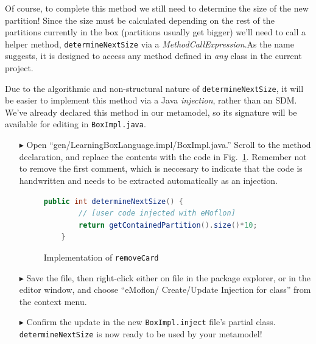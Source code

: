 Of course, to complete this method we still need to determine the size of the new partition! Since the size must be calculated depending on the
rest of the partitions currently in the box (partitions usually get bigger) we'll need to call a helper method, \texttt{determineNextSize} via a
\emph{MethodCallExpression}.As the name suggests, it is designed to access any method defined in \emph{any} class in the current project.

Due to the algorithmic and non-structural nature of \texttt{determineNextSize}, it will be easier to implement this method via a Java \emph{injection}, rather
than an SDM. We've already declared this method in our metamodel, so its signature will be available for editing in \texttt{BoxImpl.java}.

\begin{itemize}

\item[$\blacktriangleright$] Open ``gen/LearningBoxLanguage.impl/BoxImpl.java.'' Scroll to the method declaration, and replace the contents with the code in
Fig.~\ref{code:determineNextSize_impl}. Remember not to remove the first comment, which is neccesary to indicate that the code is handwritten and needs to be
extracted automatically as an injection.

\begin{figure}[htbp]
        \centering
        \begin{lstlisting}[language=Java, keywordstyle={\bfseries\color{purple}}, backgroundcolor=\color{white}]
    public int determineNextSize() {
    	// [user code injected with eMoflon]
        return getContainedPartition().size()*10;
    }
        \end{lstlisting}
        \caption{Implementation of \texttt{removeCard}}
        \label{code:determineNextSize_impl}
\end{figure}


\item[$\blacktriangleright$] Save the file, then right-click either on file in the package explorer, or in the editor window, and choose ``eMoflon/
Create/Update Injection for class'' from the context menu. 

\item[$\blacktriangleright$] Confirm the update in the new \texttt{BoxImpl.inject} file's partial class. \texttt{determineNextSize} is now ready to be used by
your metamodel!


\end{itemize}




